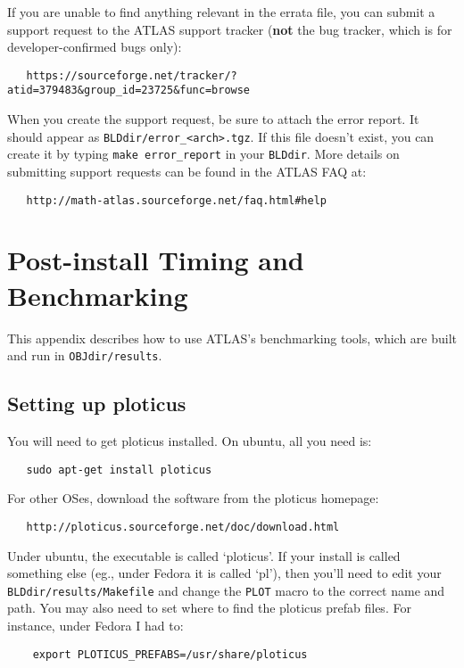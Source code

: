 \documentclass[11pt]{article}
\begin{document}
If you are unable to find anything relevant in the errata file, you can
submit a support request to the ATLAS support tracker ({\bf not} the
bug tracker, which is for developer-confirmed bugs only):
\vspace*{-0.1in}
\begin{verbatim}
   https://sourceforge.net/tracker/?atid=379483&group_id=23725&func=browse
\end{verbatim}

When you create the support request, be sure to attach the error report.
It should appear as \verb|BLDdir/error_<arch>.tgz|.  If this file doesn't
exist, you can create it by typing \verb|make error_report| in your
{\tt BLDdir}.  More details on submitting support requests can be found
in the ATLAS FAQ at:
\vspace*{-0.1in}
\begin{verbatim}
   http://math-atlas.sourceforge.net/faq.html#help
\end{verbatim}





\newpage
\appendix

\section{Post-install Timing and Benchmarking}

This appendix describes how to use ATLAS's benchmarking tools, which are
built and run in {\tt OBJdir/results}.

\subsection{Setting up ploticus}
You will need to get ploticus installed.  On ubuntu, all you need is:
\begin{verbatim}
   sudo apt-get install ploticus
\end{verbatim}

For other OSes, download the software from the ploticus homepage:
\begin{verbatim}
   http://ploticus.sourceforge.net/doc/download.html
\end{verbatim}

Under ubuntu, the executable is called `ploticus'.  If your install
is called something else (eg., under Fedora it is called `pl'), then
you'll need to edit your {\tt BLDdir/results/Makefile} and change the
{\tt PLOT} macro to the correct name and path.  You may also need
to set where to find the ploticus prefab files.  For instance, under
Fedora I had to:
\begin{verbatim}
    export PLOTICUS_PREFABS=/usr/share/ploticus
\end{verbatim}
\end{document}

